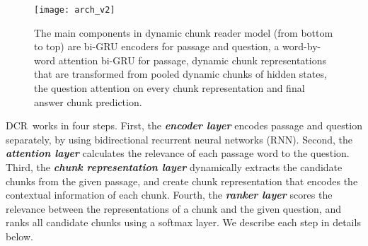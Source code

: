 \documentclass[letterpaper]{article}
\newcommand{\dcr}{DCR}
\begin{document}
\begin{figure}
\begin{center}
\texttt{[image: arch\_v2]}
\caption{{The main components in dynamic chunk reader model (from bottom to top) are bi-GRU encoders for passage and question, a word-by-word attention bi-GRU for passage, dynamic chunk representations that are transformed from pooled dynamic chunks of hidden states, the question attention on every chunk representation and final answer chunk prediction.}}
\label{fig_arch}
\vspace{-0.2in}
\end{center}
\end{figure}

\dcr\ works in four steps.
First, the \textit{\textbf{encoder layer}} encodes passage and question separately, by using bidirectional recurrent neural networks (RNN).
Second, the \textit{\textbf{attention layer}} calculates the relevance of each passage word to the question.
Third, the \textit{\textbf{chunk representation layer}} dynamically extracts the candidate chunks from the given passage, and create chunk representation that encodes the contextual information of each chunk.
Fourth, the \textit{\textbf{ranker layer}} scores the relevance between the representations of a chunk and the given question, and ranks all candidate chunks using a softmax layer.  
We describe each step in details below.
\end{document}
